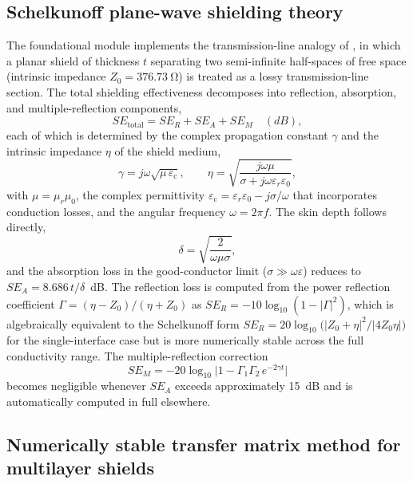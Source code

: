 \documentclass[review,3p,authoryear]{elsarticle}
\begin{document}
\subsection{Schelkunoff plane-wave shielding theory}
\label{sec:schelkunoff}

The foundational module implements the transmission-line analogy of \citet{Schelkunoff1934}, in which a planar shield of thickness $t$ separating two semi-infinite half-spaces of free space (intrinsic impedance $Z_0 = \SI{376.73}{\ohm}$) is treated as a lossy transmission-line section. The total shielding effectiveness decomposes into reflection, absorption, and multiple-reflection components,
\begin{equation}
SE_{\mathrm{total}} = SE_R + SE_A + SE_M \quad (\si{dB}),
\label{eq:se_total}
\end{equation}
each of which is determined by the complex propagation constant $\gamma$ and the intrinsic impedance $\eta$ of the shield medium,
\begin{equation}
\gamma = j\omega\sqrt{\mu \, \varepsilon_{\mathrm{c}}}, \qquad
\eta = \sqrt{\frac{j\omega\mu}{\sigma + j\omega\varepsilon_r\varepsilon_0}},
\label{eq:gamma_eta}
\end{equation}
with $\mu = \mu_r\mu_0$, the complex permittivity $\varepsilon_{\mathrm{c}} = \varepsilon_r\varepsilon_0 - j\sigma/\omega$ that incorporates conduction losses, and the angular frequency $\omega = 2\pi f$. The skin depth follows directly,
\begin{equation}
\delta = \sqrt{\frac{2}{\omega\mu\sigma}},
\label{eq:skin}
\end{equation}
and the absorption loss in the good-conductor limit ($\sigma \gg \omega\varepsilon$) reduces to $SE_A = 8.686\,t/\delta$~dB. The reflection loss is computed from the power reflection coefficient $\Gamma = (\eta - Z_0)/(\eta + Z_0)$ as $SE_R = -10\log_{10}(1 - |\Gamma|^2)$, which is algebraically equivalent to the Schelkunoff form $SE_R = 20\log_{10}\bigl(|Z_0 + \eta|^2 / |4Z_0\eta|\bigr)$ for the single-interface case but is more numerically stable across the full conductivity range. The multiple-reflection correction
\begin{equation}
SE_M = -20\log_{10}\bigl| 1 - \Gamma_1\Gamma_2\, e^{-2\gamma t} \bigr|
\label{eq:se_m}
\end{equation}
becomes negligible whenever $SE_A$ exceeds approximately \SI{15}{dB} and is automatically computed in full elsewhere.

\subsection{Numerically stable transfer matrix method for multilayer shields}
\label{sec:tmm}
\end{document}
